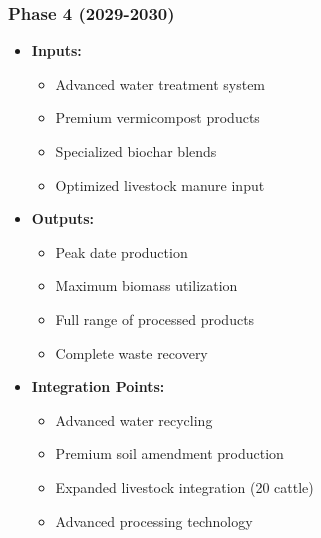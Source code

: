 \subsubsection{Phase 4 (2029-2030)}
\begin{itemize}
    \item \textbf{Inputs:}
    \begin{itemize}
        \item Advanced water treatment system
        \item Premium vermicompost products
        \item Specialized biochar blends
        \item Optimized livestock manure input
    \end{itemize}
    \item \textbf{Outputs:}
    \begin{itemize}
        \item Peak date production
        \item Maximum biomass utilization
        \item Full range of processed products
        \item Complete waste recovery
    \end{itemize}
    \item \textbf{Integration Points:}
    \begin{itemize}
        \item Advanced water recycling
        \item Premium soil amendment production
        \item Expanded livestock integration (20 cattle)
        \item Advanced processing technology
    \end{itemize}
\end{itemize}


